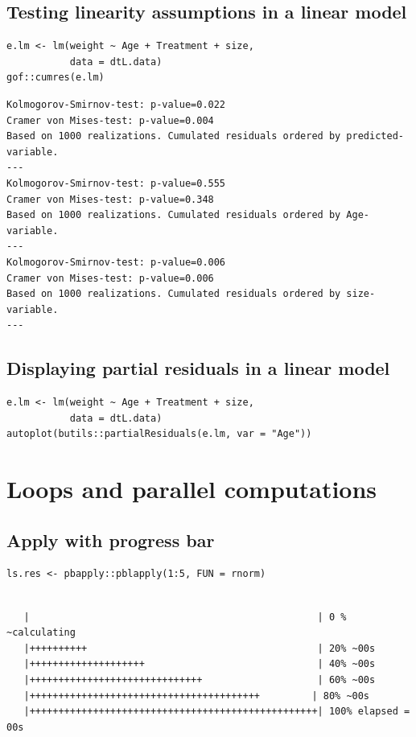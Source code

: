 \documentclass{article}
\begin{document}
\subsection{Testing linearity assumptions in a linear model}
\label{sec:orga05dbdd}
\lstset{language=r,label= ,caption= ,captionpos=b,numbers=none}
\begin{lstlisting}
e.lm <- lm(weight ~ Age + Treatment + size,
		   data = dtL.data)
gof::cumres(e.lm)
\end{lstlisting}

\begin{verbatim}
Kolmogorov-Smirnov-test: p-value=0.022
Cramer von Mises-test: p-value=0.004
Based on 1000 realizations. Cumulated residuals ordered by predicted-variable.
---
Kolmogorov-Smirnov-test: p-value=0.555
Cramer von Mises-test: p-value=0.348
Based on 1000 realizations. Cumulated residuals ordered by Age-variable.
---
Kolmogorov-Smirnov-test: p-value=0.006
Cramer von Mises-test: p-value=0.006
Based on 1000 realizations. Cumulated residuals ordered by size-variable.
---
\end{verbatim}
\subsection{Displaying partial residuals in a linear model}
\label{sec:org951b265}
\lstset{language=r,label= ,caption= ,captionpos=b,numbers=none}
\begin{lstlisting}
e.lm <- lm(weight ~ Age + Treatment + size,
		   data = dtL.data)
autoplot(butils::partialResiduals(e.lm, var = "Age"))
\end{lstlisting}

\section{Loops and parallel computations}
\label{sec:orge822d30}
\subsection{Apply with progress bar}
\label{sec:org0636744}

\lstset{language=r,label= ,caption= ,captionpos=b,numbers=none}
\begin{lstlisting}
ls.res <- pbapply::pblapply(1:5, FUN = rnorm)
\end{lstlisting}

\begin{verbatim}

   |                                                  | 0 % ~calculating  
   |++++++++++                                        | 20% ~00s          
   |++++++++++++++++++++                              | 40% ~00s          
   |++++++++++++++++++++++++++++++                    | 60% ~00s          
   |++++++++++++++++++++++++++++++++++++++++         | 80% ~00s          
   |++++++++++++++++++++++++++++++++++++++++++++++++++| 100% elapsed = 00s
\end{verbatim}
\end{document}
